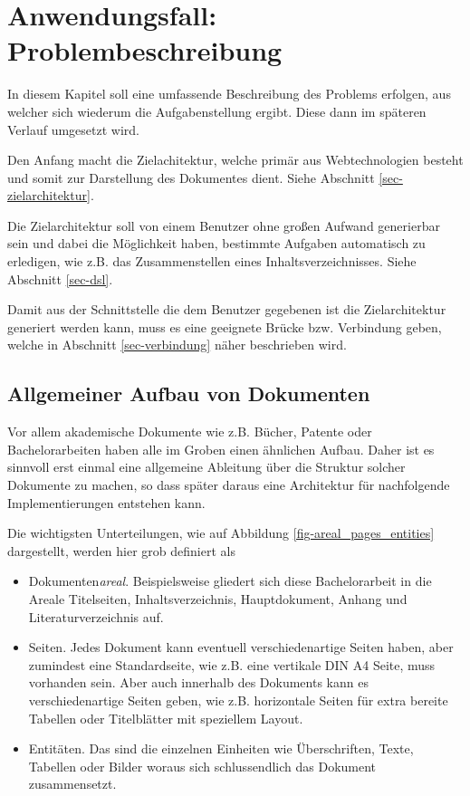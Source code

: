 \chapter{Anwendungsfall: Problembeschreibung}

In diesem Kapitel soll eine umfassende Beschreibung des Problems erfolgen,
aus welcher sich wiederum die Aufgabenstellung ergibt. Diese dann im
späteren Verlauf umgesetzt wird.

Den Anfang macht die Zielachitektur, welche primär aus Webtechnologien
besteht und somit zur Darstellung des Dokumentes dient. Siehe
Abschnitt \ref{sec-zielarchitektur}.

Die Zielarchitektur soll von einem Benutzer ohne großen Aufwand
generierbar sein und dabei die Möglichkeit haben, bestimmte
Aufgaben automatisch zu erledigen, wie z.B. das Zusammenstellen
eines Inhaltsverzeichnisses. Siehe Abschnitt \ref{sec-dsl}.

Damit aus der Schnittstelle die dem Benutzer gegebenen ist die Zielarchitektur
generiert werden kann, muss es eine geeignete Brücke bzw. Verbindung
geben, welche in Abschnitt \ref{sec-verbindung} näher beschrieben wird.

\section{Allgemeiner Aufbau von Dokumenten}

Vor allem akademische Dokumente wie z.B. Bücher, Patente oder Bachelorarbeiten
haben alle im Groben einen ähnlichen Aufbau. Daher ist es sinnvoll erst einmal
eine allgemeine Ableitung über die Struktur solcher Dokumente zu machen, so dass
später daraus eine Architektur für nachfolgende Implementierungen entstehen kann.

Die wichtigsten Unterteilungen,
  wie auf Abbildung \ref{fig-areal_pages_entities} dargestellt,
werden hier grob definiert als

\begin{itemize}
  \item Dokumenten\emph{areal}.
        Beispielsweise gliedert sich diese Bachelorarbeit in die
        Areale Titelseiten, Inhaltsverzeichnis, Hauptdokument, Anhang und
        Literaturverzeichnis auf.
  \item Seiten.
        Jedes Dokument kann eventuell verschiedenartige Seiten haben, aber zumindest
        eine Standardseite, wie z.B. eine vertikale DIN A4 Seite,
        muss vorhanden sein.
        Aber auch innerhalb des Dokuments kann es verschiedenartige Seiten
        geben, wie z.B. horizontale Seiten für extra bereite Tabellen oder
        Titelblätter mit speziellem Layout.
  \item Entitäten.
        Das sind die einzelnen Einheiten wie Überschriften, Texte, Tabellen
        oder Bilder woraus sich schlussendlich das Dokument zusammensetzt.
\end{itemize}

